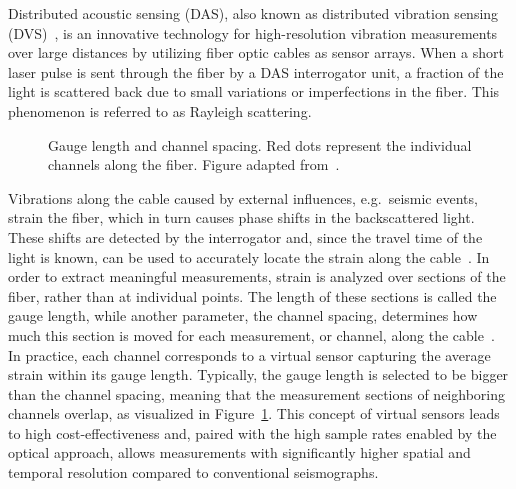 Distributed acoustic sensing (DAS), also known as distributed vibration sensing (DVS)~\cite{DAS}, is an innovative technology for high-resolution vibration measurements over large distances by utilizing fiber optic cables as sensor arrays.
When a short laser pulse is sent through the fiber by a DAS interrogator unit, a fraction of the light is scattered back due to small variations or imperfections in the fiber.
This phenomenon is referred to as Rayleigh scattering.
\begin{figure}
    \centering

    \caption{
        Gauge length and channel spacing. Red dots represent the individual channels along the fiber.
        Figure adapted from~\cite{GaugeLength}.
    }\label{fig:gauge-length}
\end{figure}
Vibrations along the cable caused by external influences, e.g.\ seismic events, strain the fiber, which in turn causes phase shifts in the backscattered light.
These shifts are detected by the interrogator and, since the travel time of the light is known, can be used to accurately locate the strain along the cable~\cite{DAS-N2N}.
In order to extract meaningful measurements, strain is analyzed over sections of the fiber, rather than at individual points.
The length of these sections is called the gauge length, while another parameter, the channel spacing, determines how much this section is moved for each measurement, or channel, along the cable~\cite{GaugeLength}.
In practice, each channel corresponds to a virtual sensor capturing the average strain within its gauge length.
Typically, the gauge length is selected to be bigger than the channel spacing, meaning that the measurement sections of neighboring channels overlap, as visualized in Figure~\ref{fig:gauge-length}.
This concept of virtual sensors leads to high cost-effectiveness and, paired with the high sample rates enabled by the optical approach, allows measurements with significantly higher spatial and temporal resolution compared to conventional seismographs.

